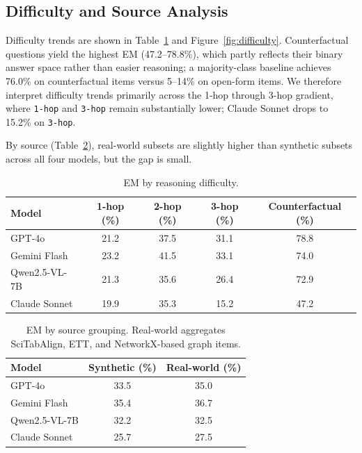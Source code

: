 \documentclass{article}
\begin{document}
\subsection{Difficulty and Source Analysis}
Difficulty trends are shown in Table~\ref{tab:difficulty} and Figure~\ref{fig:difficulty}. Counterfactual questions yield the highest EM (47.2--78.8\%), which partly reflects their binary answer space rather than easier reasoning; a majority-class baseline achieves 76.0\% on counterfactual items versus 5--14\% on open-form items. We therefore interpret difficulty trends primarily across the 1-hop through 3-hop gradient, where \texttt{1-hop} and \texttt{3-hop} remain substantially lower; Claude Sonnet drops to 15.2\% on \texttt{3-hop}.

By source (Table~\ref{tab:source}), real-world subsets are slightly higher than synthetic subsets across all four models, but the gap is small.


\begin{table}[t]
\centering
\small
\caption{EM by reasoning difficulty.}
\label{tab:difficulty}
\begin{tabular}{lcccc}
\toprule
Model & 1-hop (\%) & 2-hop (\%) & 3-hop (\%) & Counterfactual (\%) \\
\midrule
GPT-4o & 21.2 & 37.5 & 31.1 & 78.8 \\
Gemini Flash & 23.2 & 41.5 & 33.1 & 74.0 \\
Qwen2.5-VL-7B & 21.3 & 35.6 & 26.4 & 72.9 \\
Claude Sonnet & 19.9 & 35.3 & 15.2 & 47.2 \\
\bottomrule
\end{tabular}
\end{table}

\begin{table}[t]
\centering
\small
\caption{EM by source grouping. Real-world aggregates SciTabAlign, ETT, and NetworkX-based graph items.}
\label{tab:source}
\begin{tabular}{lcc}
\toprule
Model & Synthetic (\%) & Real-world (\%) \\
\midrule
GPT-4o & 33.5 & 35.0 \\
Gemini Flash & 35.4 & 36.7 \\
Qwen2.5-VL-7B & 32.2 & 32.5 \\
Claude Sonnet & 25.7 & 27.5 \\
\bottomrule
\end{tabular}
\end{table}
\end{document}
